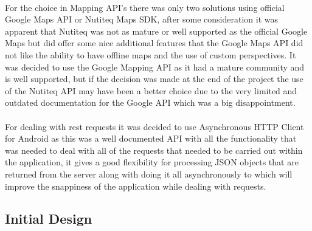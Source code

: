 \\
For the choice in Mapping API's there was only two solutions using official Google Maps API or Nutiteq Maps SDK, after some consideration it was apparent that Nutiteq was not as mature or well supported as the official Google Maps but did offer some nice additional features that the Google Maps API did not like the ability to have offline maps and the use of custom perspectives. It was decided to use the Google Mapping API as it had a mature community and is well supported, but if the decision was made at the end of the project the use of the Nutiteq API may have been a better choice due to the very limited and outdated documentation for the Google API which was a big disappointment.\\
\\
For dealing with rest requests it was decided to use Asynchronous HTTP Client for Android \cite{nknj:AndroidAsynchronousHttpClientloopjandthePersistentCookieStore:2013:online} as this was a well documented API with all the functionality that was needed to deal with all of the requests that needed to be carried out within the application, it gives a good flexibility for processing JSON objects that are returned from the server along with doing it all asynchronously to which will improve the snappiness of the application while dealing with requests.\\

\subsection{Initial Design}

